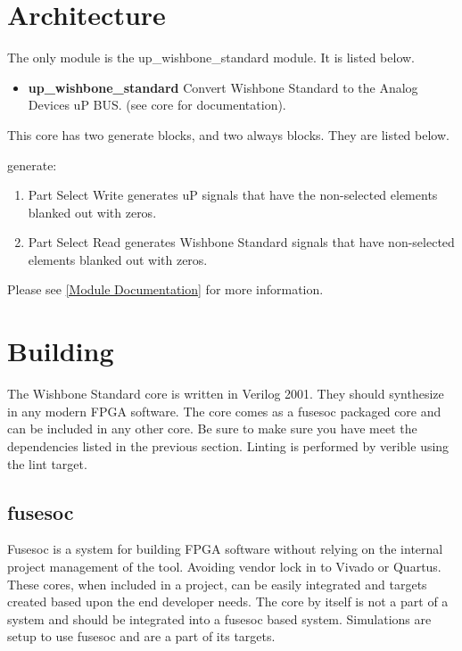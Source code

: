 \section{Architecture}
\par
The only module is the up\_wishbone\_standard module. It is listed below.

\begin{itemize}
  \item \textbf{up\_wishbone\_standard} Convert Wishbone Standard to the Analog Devices uP BUS. (see core for documentation).
\end{itemize}

\par
This core has two generate blocks, and two always blocks. They are listed below.

generate:
\begin{enumerate}
\item Part Select Write generates uP signals that have the non-selected elements blanked out with zeros.
\item Part Select Read generates Wishbone Standard signals that have non-selected elements blanked out with zeros.
\end{enumerate}

Please see \ref{Module Documentation} for more information.

\section{Building}

\par
The Wishbone Standard core is written in Verilog 2001. They should synthesize in any modern FPGA software. The core comes as a fusesoc packaged core and can be included in any other core. Be sure to make sure you have meet the dependencies listed in the previous section. Linting is performed by verible using the lint target.

\subsection{fusesoc}
\par
Fusesoc is a system for building FPGA software without relying on the internal project management of the tool. Avoiding vendor lock in to Vivado or Quartus.
These cores, when included in a project, can be easily integrated and targets created based upon the end developer needs. The core by itself is not a part of
a system and should be integrated into a fusesoc based system. Simulations are setup to use fusesoc and are a part of its targets.

